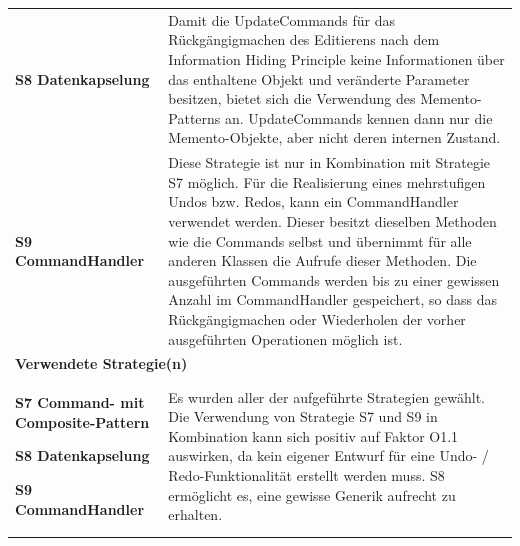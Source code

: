 \documentclass[fontsize=12pt,paper=a4,twoside]{scrartcl}
\begin{document}
\begin{tabularx}{\textwidth}{|p{6cm}|X|}
\hline
\textbf{S8 Datenkapselung} & Damit die UpdateCommands für das Rückgängigmachen des Editierens nach dem Information Hiding Principle keine Informationen über das enthaltene Objekt und veränderte Parameter besitzen, bietet sich die Verwendung des Memento-Patterns an. UpdateCommands kennen dann nur die Memento-Objekte, aber nicht deren internen Zustand.\\
\textbf{S9 CommandHandler} & Diese Strategie ist nur in Kombination mit Strategie S7 möglich. Für die Realisierung eines mehrstufigen Undos bzw. Redos, kann ein CommandHandler verwendet werden. Dieser besitzt dieselben Methoden wie die Commands selbst und übernimmt für alle anderen Klassen die Aufrufe dieser Methoden. Die ausgeführten Commands werden bis zu einer gewissen Anzahl im CommandHandler gespeichert, so dass das Rückgängigmachen oder Wiederholen der vorher ausgeführten Operationen möglich ist.\\\hline
 
\multicolumn{2}{|l|}{\textbf{Verwendete Strategie(n)}} \\\hline
\textbf{S7 Command- mit Composite-Pattern}\newline

\textbf{S8 Datenkapselung}\newline

\textbf{S9 CommandHandler}   & Es wurden aller der aufgeführte Strategien gewählt. Die Verwendung von Strategie S7 und S9 in Kombination kann sich positiv auf Faktor O1.1 auswirken, da kein eigener Entwurf für eine Undo- / Redo-Funktionalität erstellt werden muss. S8 ermöglicht es, eine gewisse Generik aufrecht zu erhalten.\\\hline
\end{tabularx}
\end{document}
